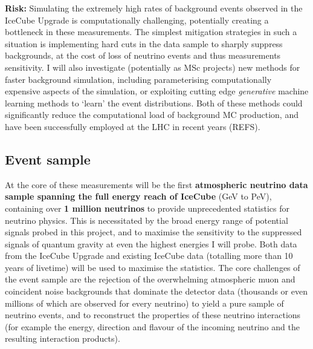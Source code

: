 \documentclass[a4paper,11pt]{article}
\begin{document}
\textbf{Risk:} Simulating the extremely high rates of background events observed in the IceCube Upgrade is computationally challenging, potentially creating a bottleneck in these measurements. The simplest mitigation strategies in such a situation is implementing hard cuts in the data sample to sharply suppress backgrounds, at the cost of loss of neutrino events and thus measurements sensitivity. I will also investigate (potentially as MSc projects) new methods for faster background simulation, including parameterising computationally expensive aspects of the simulation, or exploiting cutting edge \textit{generative} machine learning methods to `learn' the event distributions. Both of these methods could significantly reduce the computational load of background MC production, and have been successfully employed at the LHC in recent years (REFS). \\


\subsection{Event sample}

At the core of these measurements will be the first \textbf{atmospheric neutrino data sample spanning the full energy reach of IceCube} (GeV to PeV), containing over \textbf{1 million neutrinos} to provide unprecedented statistics for neutrino physics. This is necessitated by the broad energy range of potential signals probed in this project, and to maximise the sensitivity to the suppressed signals of quantum gravity at even the highest energies I will probe. Both data from the IceCube Upgrade and existing IceCube data (totalling more than 10 years of livetime) will be used to maximise the statistics. The core challenges of the event sample are the rejection of the overwhelming atmospheric muon and coincident noise backgrounds that dominate the detector data (thousands or even millions of which are observed for every neutrino) to yield a pure sample of neutrino events, and to reconstruct the properties of these neutrino interactions (for example the energy, direction and flavour of the incoming neutrino and the resulting interaction products).
\end{document}
